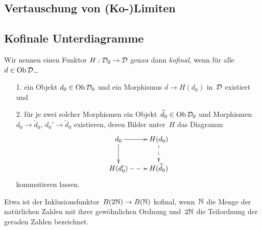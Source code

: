\subsection{Vertauschung von (Ko-)Limiten}


\subsection{Kofinale Unterdiagramme}

\begin{defn}
Wir nennen einen Funktor $H : \mathcal{D}_0 \to \mathcal{D}$ genau dann \emph{kofinal}, wenn
für alle~$d \in \operatorname{Ob}\mathcal{D}$\ldots
\begin{enumerate}
\item[1.] ein Objekt $d_0 \in \operatorname{Ob}\mathcal{D}_0$ und ein Morphismus $d \to
H(d_0)$ in~$\mathcal{D}$ existiert und
\item[2.] für je zwei solcher Morphismen ein Objekt~$\widetilde d_0 \in \operatorname{Ob}\mathcal{D}_0$ und
Morphismen $d_0 \to \widetilde d_0$, $d_0' \to \widetilde d_0$ existieren, deren Bilder
unter~$H$ das Diagramm
\[ \xymatrix{
  d_0 \ar[r] \ar[d] & H(d_0) \ar@{-->}[d] \\
  H(d_0') \ar@{-->}[r] & H(\widetilde d_0)
} \]
kommutieren lassen.
\end{enumerate}
\end{defn}

Etwa ist der Inklusionsfunktor~$B (2\mathbb{N}) \to B(\mathbb{N})$ kofinal, wenn~$\mathbb{N}$ die
Menge der natürlichen Zahlen mit ihrer gewöhnlichen Ordnung und~$2\mathbb{N}$ die
Teilordnung der geraden Zahlen bezeichnet.


